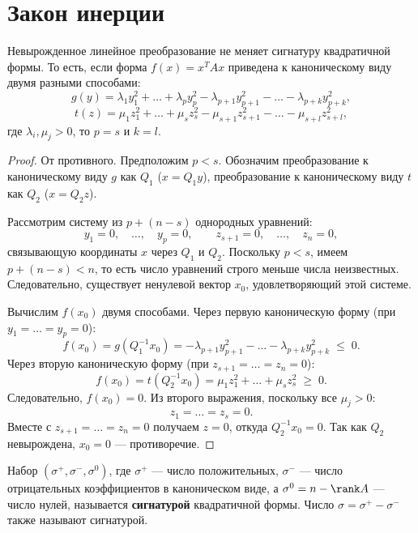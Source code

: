 \documentclass[12pt]{article}
\begin{document}
\section{Закон инерции}
\begin{theorem}
Невырожденное линейное преобразование не меняет сигнатуру квадратичной формы. То есть, если форма $f(x) = x^T A x$ приведена к каноническому виду двумя разными способами:
\[
g(y) = \lambda_1 y_1^2 + \dots + \lambda_p y_p^2 - \lambda_{p+1} y_{p+1}^2 - \dots - \lambda_{p+k} y_{p+k}^2,
\]
\[
t(z) = \mu_1 z_1^2 + \dots + \mu_s z_s^2 - \mu_{s+1} z_{s+1}^2 - \dots - \mu_{s+l} z_{s+l}^2,
\]
где $\lambda_i, \mu_j > 0$, то $p = s$ и $k = l$.
\end{theorem}

\begin{proof}
От противного. Предположим $p < s$. Обозначим преобразование к каноническому виду $g$ как $Q_1$ ($x = Q_1 y$), преобразование к каноническому виду $t$ как $Q_2$ ($x = Q_2 z$).

Рассмотрим систему из $p + (n - s)$ однородных уравнений:
\[
y_1 = 0,\quad \dots,\quad y_p = 0, \qquad z_{s+1} = 0,\quad \dots,\quad z_n = 0,
\]
связывающую координаты $x$ через $Q_1$ и $Q_2$. Поскольку $p < s$, имеем $p + (n - s) < n$, то есть число уравнений строго меньше числа неизвестных. Следовательно, существует ненулевой вектор $x_0$, удовлетворяющий этой системе.

Вычислим $f(x_0)$ двумя способами. Через первую каноническую форму (при $y_1 = \dots = y_p = 0$):
\[
f(x_0) = g(Q_1^{-1} x_0) = -\lambda_{p+1} y_{p+1}^2 - \dots - \lambda_{p+k} y_{p+k}^2 \;\le\; 0.
\]
Через вторую каноническую форму (при $z_{s+1} = \dots = z_n = 0$):
\[
f(x_0) = t(Q_2^{-1} x_0) = \mu_1 z_1^2 + \dots + \mu_s z_s^2 \;\ge\; 0.
\]
Следовательно, $f(x_0) = 0$. Из второго выражения, поскольку все $\mu_j > 0$:
\[
z_1 = \dots = z_s = 0.
\]
Вместе с $z_{s+1} = \dots = z_n = 0$ получаем $z = 0$, откуда $Q_2^{-1} x_0 = 0$. Так как $Q_2$ невырождена, $x_0 = 0$ --- противоречие.
\end{proof}

\begin{definition}
Набор $(\sigma^+, \sigma^-, \sigma^0)$, где $\sigma^+$ --- число положительных, $\sigma^-$ --- число отрицательных коэффициентов в каноническом виде, а $\sigma^0 = n - \rank A$ --- число нулей, называется \textbf{сигнатурой} квадратичной формы. Число $\sigma = \sigma^+ - \sigma^-$ также называют сигнатурой.
\end{definition}
\end{document}
